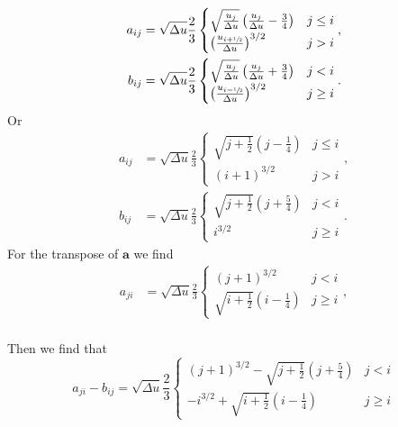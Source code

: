 \documentclass{book}
\newcommand{\frachalf}{\ensuremath{\sfrac{1}{2}}}
\newcommand{\phalf}[1]{\ensuremath{{#1}+\frachalf}}
\newcommand{\mhalf}[1]{\ensuremath{{#1}-\frachalf}}
\newcommand{\bmat}[1]{{\ensuremath{\bm {#1}}}}
\begin{document}
\begin{alignat}{2}
	a_{ij}
		&= \sqrt{\Delta u}\frac{2}{3}\begin{cases}
			\sqrt{\frac{u_j}{\Delta u}}\left(\frac{u_j}{\Delta u} -\frac{3}{4}\right)    & j \leq i \\
			\left(\frac{u_{\phalf{i}}}{\Delta u}\right)^{3/2} & j > i
		\end{cases}, \\
	b_{ij}
		&= \sqrt{\Delta u}\frac{2}{3}\begin{cases}
			\sqrt{\frac{u_j}{\Delta u}}\left(\frac{u_j}{\Delta u} +\frac{3}{4}\right)    & j < i \\
			\left(\frac{u_{\mhalf{i}}}{\Delta u}\right)^{3/2} & j \geq i
		\end{cases}.
\end{alignat}
Or
\begin{align}
	a_{ij}
		&= \sqrt{\Delta u}\frac{2}{3}\begin{cases}
			\sqrt{j+\frac{1}{2}}\left(j -\frac{1}{4}\right)    & j \leq i \\
			(i+1)^{3/2} & j > i
		\end{cases}, \label{eq:ee:a} \\
	b_{ij}
		&= \sqrt{\Delta u}\frac{2}{3}\begin{cases}
			\sqrt{j+\frac{1}{2}}\left(j +\frac{5}{4}\right)    & j < i \\
			i^{3/2} & j \geq i
		\end{cases}. \label{eq:ee:b}
\end{align}
For the transpose of $\bmat{a}$ we find
\begin{align}
	a_{ji}
		&= \sqrt{\Delta u}\frac{2}{3}\begin{cases}
			(j+1)^{3/2} & j < i \\
			\sqrt{i+\frac{1}{2}}\left(i -\frac{1}{4}\right)    & j \geq i
		\end{cases}, \label{eq:ee:aT} \\
\end{align}


Then we find that
\begin{equation}
  a_{ji}-b_{ij} = \sqrt{\Delta u}\frac{2}{3}\begin{cases}
			(j+1)^{3/2} - \sqrt{j+\frac{1}{2}}\left(j +\frac{5}{4}\right) & j < i \\
			-i^{3/2} + \sqrt{i+\frac{1}{2}}\left(i -\frac{1}{4}\right)    & j \geq i
	\end{cases}
\end{equation}
\end{document}
